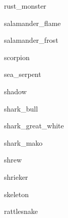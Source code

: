 \documentclass[letterpaper,serif]{module}
\begin{document}
\begin{newmonster}{rust_monster}\end{newmonster}

\begin{newmonster}{salamander_flame}\end{newmonster}

\begin{newmonster}{salamander_frost}\end{newmonster}

\begin{newmonster}{scorpion}\end{newmonster}

\begin{newmonster}{sea_serpent}\end{newmonster}

\begin{newmonster}{shadow}\end{newmonster}

\begin{newmonster}{shark_bull}\end{newmonster}

\begin{newmonster}{shark_great_white}\end{newmonster}

\begin{newmonster}{shark_mako}\end{newmonster}

\begin{newmonster}{shrew}\end{newmonster}

\begin{newmonster}{shrieker}\end{newmonster}

\begin{newmonster}{skeleton}\end{newmonster}

\begin{newmonster}{rattlesnake}\end{newmonster}
\end{document}
